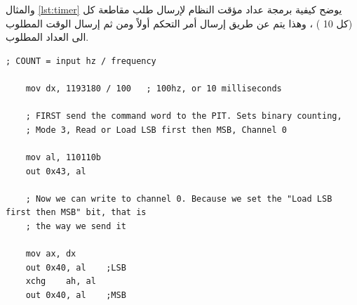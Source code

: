 \documentclass[document.tex]{subfiles}
\begin{document}
والمثال \ref{lst:timer} يوضح كيفية برمجة عداد مؤقت النظام لإرسال طلب مقاطعة كل  (كل 10 ) ، وهذا يتم عن طريق إرسال أمر التحكم أولاً ومن ثم إرسال الوقت المطلوب الى العداد المطلوب.

\begin{english}

\lstset{numberstyle=\tiny,numbersep=5pt,tabsize=2,extendedchars=true,breaklines=true,frame=b,showspaces=false, showtabs=false,xleftmargin=10pt,framexleftmargin=10pt,framexrightmargin=5pt,framexbottommargin=4pt,showstringspaces=false,language=[x86masm]Assembler}


\begin{lstlisting}[label=lst:timer,caption=\en{PIT programming}]
       ; COUNT = input hz / frequency
 
	mov	dx, 1193180 / 100	; 100hz, or 10 milliseconds
 
	; FIRST send the command word to the PIT. Sets binary counting,
	; Mode 3, Read or Load LSB first then MSB, Channel 0
 
	mov	al, 110110b
	out	0x43, al
 
	; Now we can write to channel 0. Because we set the "Load LSB first then MSB" bit, that is
	; the way we send it
 
	mov	ax, dx
	out	0x40, al	;LSB
	xchg	ah, al
	out	0x40, al	;MSB
\end{lstlisting}
\end{english}
\end{document}
